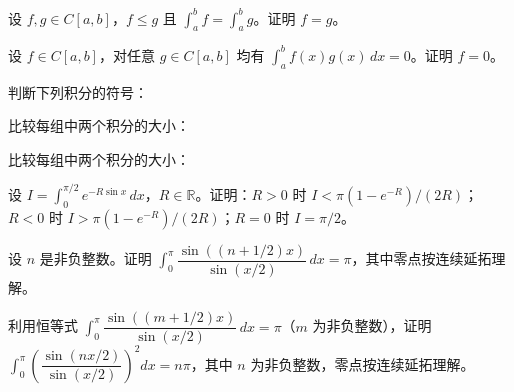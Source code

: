 \newpage
\noindent\begin{minipage}{\textwidth}
设 $f,g\in C[a,b]$，$f\le g$ 且 $\int_a^b f=\int_a^b g$。证明 $f=g$。
\end{minipage}\par\vfill
\noindent\begin{minipage}{\textwidth}
设 $f\in C[a,b]$，对任意 $g\in C[a,b]$ 均有 $\int_a^b f(x)g(x)\,dx=0$。证明 $f=0$。
\end{minipage}\par\vfill
\noindent\begin{minipage}{\textwidth}
判断下列积分的符号：
\end{minipage}\par\vfill
\newpage
\noindent\begin{minipage}{\textwidth}
比较每组中两个积分的大小：
\end{minipage}\par\vfill
\noindent\begin{minipage}{\textwidth}
比较每组中两个积分的大小：
\end{minipage}\par\vfill
\noindent\begin{minipage}{\textwidth}
设 $I=\int_0^{\pi/2}e^{-R\sin x}\,dx$，$R\in\mathbb R$。证明：$R>0$ 时 $I<\pi(1-e^{-R})/(2R)$；$R<0$ 时 $I>\pi(1-e^{-R})/(2R)$；$R=0$ 时 $I=\pi/2$。
\end{minipage}\par\vfill
\newpage
\noindent\begin{minipage}{\textwidth}
设 $n$ 是非负整数。证明 $\int_0^\pi\dfrac{\sin((n+1/2)x)}{\sin(x/2)}\,dx=\pi$，其中零点按连续延拓理解。
\end{minipage}\par\vfill
\noindent\begin{minipage}{\textwidth}
利用恒等式 $\int_0^\pi\dfrac{\sin((m+1/2)x)}{\sin(x/2)}\,dx=\pi$（$m$ 为非负整数），证明 $\int_0^\pi\left(\dfrac{\sin(nx/2)}{\sin(x/2)}\right)^2dx=n\pi$，其中 $n$ 为非负整数，零点按连续延拓理解。
\end{minipage}\par\vfill
